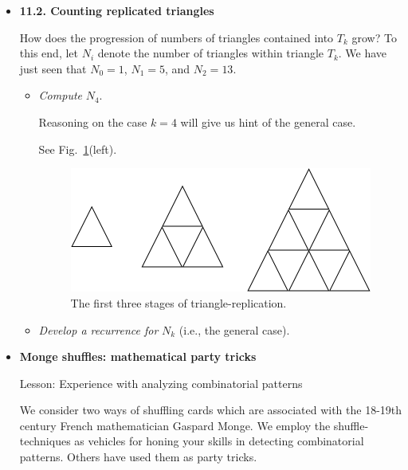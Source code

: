 \begin{itemize}
\item
{\bf 11.2. Counting replicated triangles}
\smallskip

How does the progression of numbers of triangles contained into $T_k$ grow? 
To this end, let $N_i$ denote the number of triangles within triangle $T_k$.  
We have just seen that $N_0 =1$, $N_1 = 5$, and $N_2 = 13$.
  \begin{itemize}
  \item
{\em Compute} $N_4$.
\smallskip

Reasoning on the case $k=4$ will give us hint of the general case.

See Fig.~\ref{fig:countingTriangles}(left).
\begin{figure}[h]
\begin{center}
        \includegraphics[scale=0.35]{FiguresArithmetic/CountingTriangles}
        \caption{The first three stages of triangle-replication.}
        \label{fig:countingTriangles}
\end{center}
\end{figure}

\medskip\item
{\em Develop a recurrence for} $N_k$ (i.e., the general case).
\end{itemize}



\medskip\item
{\bf Monge shuffles: mathematical party tricks}

{\sc Lesson:} Experience with analyzing combinatorial patterns

\smallskip

 

We consider two ways of shuffling cards which are associated with the 18-19th century French mathematician Gaspard Monge.  We employ the shuffle-techniques as vehicles for honing your skills in detecting combinatorial patterns.  Others have used them as party tricks.


\end{itemize}
